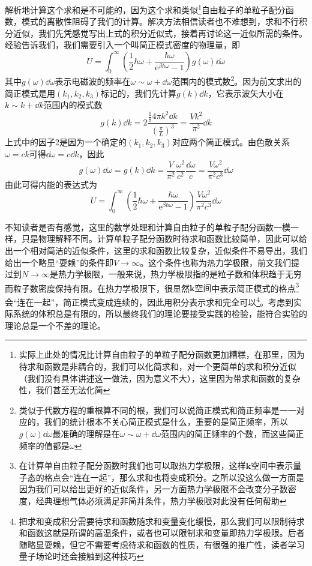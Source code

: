 \documentclass[../../main.tex]{subfiles}
\begin{document}
解析地计算这个求和是不可能的，因为这个求和类似\footnote{实际上此处的情况比计算自由粒子的单粒子配分函数更加糟糕，在那里，因为待求和函数是非耦合的，我们可以化简求和，对一个更简单的求和积分近似（我们没有具体讲述这一做法，因为意义不大），这里因为带求和函数的复杂性，我们甚至无法化简}自由粒子的单粒子配分函数，模式的离散性阻碍了我们的计算。解决方法相信读者也不难想到，求和不行积分近似，我们先凭感觉写出上式的积分近似式，接着再讨论这一近似所需的条件。经验告诉我们，我们需要引入一个叫简正模式密度的物理量，即
\begin{equation}
    U=\int_0^{\infty}\left(\frac{1}{2}\hbar\omega+\frac{\hbar\omega}{\mathrm{e}^{\beta\hbar\omega}-1}\right)g(\omega)\dd \omega
\end{equation}
其中\(g(\omega)\dd \omega\)表示电磁波的频率在\(\omega\sim\omega+\dd\omega\)范围内的模式数\footnote{类似于代数方程的重根算不同的根，我们可以说简正模式和简正频率是一一对应的，我们的统计根本不关心简正模式是什么，重要的是简正频率，所以\(g(\omega)\dd\omega\)最准确的理解是在\(\omega\sim\omega+\dd\omega\)范围内的简正频率的个数，而这些简正频率的值都是\(\omega\)}。因为前文求出的简正模式是用\((k_1,k_2,k_3)\)标记的，我们先计算\(g(k)\dd k\)，它表示波矢大小在\(k\sim k+\dd k\)范围内的模式数
\begin{equation}
    g(k)\dd k=2\frac{\frac{1}{8}4\pi k^2\dd k}{\left(\frac{\pi}{L}\right)^3}=\frac{Vk^2}{\pi^2}\dd k
\end{equation}
上式中的因子2是因为一个确定的\((k_1,k_2,k_3)\)对应两个简正模式。由色散关系\(\omega=ck\)可得\(\dd\omega=c\dd k\)，因此
\begin{equation}
    g(\omega)\dd\omega=g(k)\dd k=\frac{V}{\pi^2}\frac{\omega^2}{c^2}\frac{\dd\omega}{c}=\frac{V\omega^2}{\pi^2c^3}\dd\omega
\end{equation}
由此可得内能的表达式为
\begin{equation}\label{eq:平衡辐射内能}
    U=\int_0^{\infty}\left(\frac{1}{2}\hbar\omega+\frac{\hbar\omega}{\mathrm{e}^{\beta\hbar\omega}-1}\right)\frac{V\omega^2}{\pi^2c^3}\dd\omega
\end{equation}

不知读者是否有感觉，这里的数学处理和计算自由粒子的单粒子配分函数一模一样，只是物理解释不同。计算单粒子配分函数时待求和函数比较简单，因此可以给出一个相对简洁的近似条件，这里的求和函数比较复杂，近似条件不易导出，我们给出一个略显“耍赖”的条件即\(V\to\infty\)。这个条件也称为热力学极限，前文我们提过到\(N\to\infty\)是热力学极限，一般来说，热力学极限指的是粒子数和体积趋于无穷而粒子数密度保持有限。在热力学极限下，很显然\(\bm{k}\text{空间}\)中表示简正模式的格点\footnote{在计算单自由粒子配分函数时我们也可以取热力学极限，这样\(\bm{k}\text{空间}\)中表示量子态的格点会“连在一起”，那么求和也将变成积分。之所以没这么做一方面是因为我们可以给出更好的近似条件，另一方面热力学极限不会改变分子数密度，经典理想气体必须满足非简并条件，热力学极限对此没有任何帮助}会“连在一起”，简正模式变成连续的，因此用积分表示求和完全可以\footnote{把求和变成积分需要待求和函数随求和变量变化缓慢，那么我们可以限制待求和函数这就是所谓的高温条件，或者也可以限制求和变量即热力学极限。后者随略显耍赖，但它不需要考虑待求和函数的性质，有很强的推广性，读者学习量子场论时还会接触到这种技巧}。考虑到实际系统的体积总是有限的，所以最终我们的理论要接受实践的检验，能符合实验的理论总是一个不差的理论。
\end{document}
